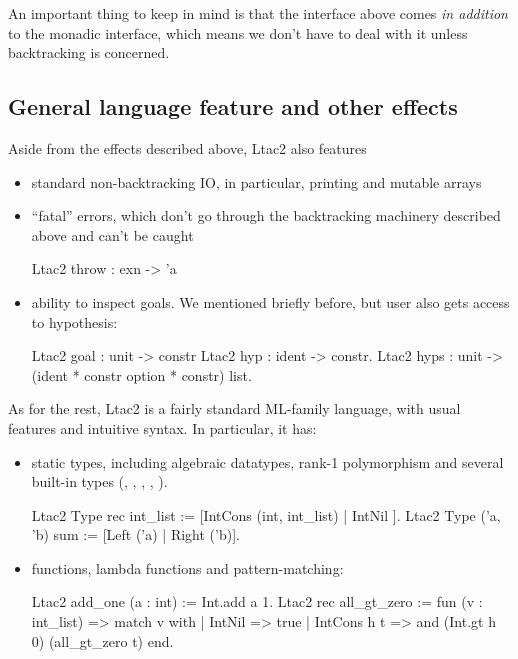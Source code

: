 An important thing to keep in mind is that the interface above comes \emph{in addition} to the monadic interface, which means we don't have to deal with it unless backtracking is concerned.

\subsection{General language feature and other effects}
\label{sec:other-effects}

Aside from the effects described above, Ltac2 also features
\begin{itemize}
\item standard non-backtracking IO, in particular, printing and mutable arrays
\item ``fatal'' errors, which don't go through the backtracking machinery described above and can't be caught
  \begin{coq}
  Ltac2 throw : exn -> 'a
  \end{coq}\vspace{-0.7em}
\item ability to inspect goals.
  We mentioned  briefly before, but user also gets access to hypothesis:
  \begin{coq}
  Ltac2 goal : unit -> constr
  Ltac2 hyp : ident -> constr.
  Ltac2 hyps : unit -> (ident * constr option * constr) list.
  \end{coq}\vspace{-0.7em}
\end{itemize}

As for the rest, Ltac2 is a fairly standard ML-family language, with usual features and intuitive syntax.
In particular, it has:
\begin{itemize}
\item static types, including algebraic datatypes, rank-1 polymorphism and several built-in types (, , , , ).
  \begin{coq}
  Ltac2 Type rec int_list := [IntCons (int, int_list) | IntNil ].
  Ltac2 Type ('a, 'b) sum := [Left ('a) | Right ('b)].
  \end{coq}
\item functions, lambda functions and pattern-matching:
  \begin{coq}
  Ltac2 add_one (a : int) := Int.add a 1.
  Ltac2 rec all_gt_zero := fun (v : int_list) =>
    match v with
    | IntNil => true
    | IntCons h t => and (Int.gt h 0) (all_gt_zero t)
    end.
  \end{coq}
\end{itemize}

